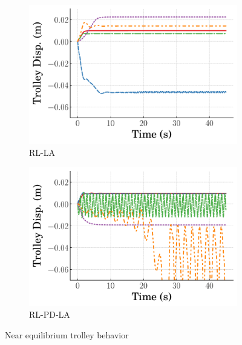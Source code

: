 \begin{figure}[tb]
\begin{subfigure}[b]{0.49\textwidth}
    \centering
    \includegraphics[width=\textwidth]{figures/figures_stability/time_responses_crane/dpcrane_RL_LA/Cart_displacement_0_init_300000_steps.pdf}
    \caption{RL-LA}
    \label{subfig_chap3:dpcrane_RL_LA_near_equil_trolley}
  \end{subfigure}
  \hfill
  \begin{subfigure}[b]{0.49\textwidth}
      \centering
      \includegraphics[width=\textwidth]{figures/figures_stability/time_responses_crane/dpcrane_RL_PD_LA/Cart_displacement_0_init_300000_steps.pdf}
      \caption{RL-PD-LA}
      \label{subfig_chap3:dpcrane_RL_PD_LA_near_equil_trolley}
  \end{subfigure}
  \hfill
  \caption{Near equilibrium trolley behavior}
  \label{fig_chap3:dpcrane_near_equil_trolley}
\end{figure}
%

